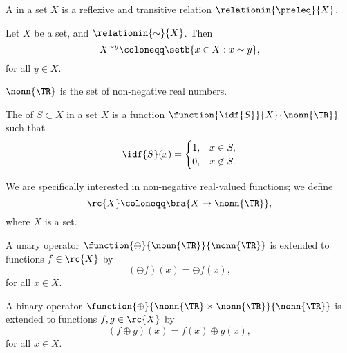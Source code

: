 \documentclass[b5paper, english, oneside]{memoir}
\begin{document}
\begin{definition}[Preorder]
A  in a set $X$ is a reflexive and transitive relation $\relationin{\preleq}{X}$.
\end{definition}

\begin{definition}
Let $X$ be a set, and $\relationin{\sim}{X}$. Then
\begin{equation}
X^{\sim y} \coloneqq \setb{x \in X : x \sim y},
\end{equation}
for all $y \in X$. 
\end{definition}

\begin{example}
$\nonn{\TR}$ is the set of non-negative real numbers.
\end{example}

\begin{definition}
The  of $S \subset X$ in a set $X$ is a function $\function{\idf{S}}{X}{\nonn{\TR}}$ such that 
\begin{equation}
\idf{S}(x) = 
\begin{cases}
1, & x \in S, \\
0, & x \not\in S.
\end{cases}
\end{equation}
\end{definition}

\begin{definition}
We are specifically interested in non-negative real-valued functions; we define 
\begin{equation}
\rc{X} \coloneqq \bra{X \to \nonn{\TR}},
\end{equation}
where $X$ is a set. 
\end{definition}

\begin{definition}
A unary operator $\function{\ominus}{\nonn{\TR}}{\nonn{\TR}}$ is extended to functions $f \in \rc{X}$ by
\begin{equation}
(\ominus f)(x) = \ominus f(x),
\end{equation}
for all $x \in X$.
\end{definition}

\begin{definition}
A binary operator $\function{\oplus}{\nonn{\TR} \times \nonn{\TR}}{\nonn{\TR}}$ is extended to functions $f, g \in \rc{X}$ by
\begin{equation}
(f \oplus g)(x) = f(x) \oplus g(x),
\end{equation}
for all $x \in X$.
\end{definition}
\end{document}
